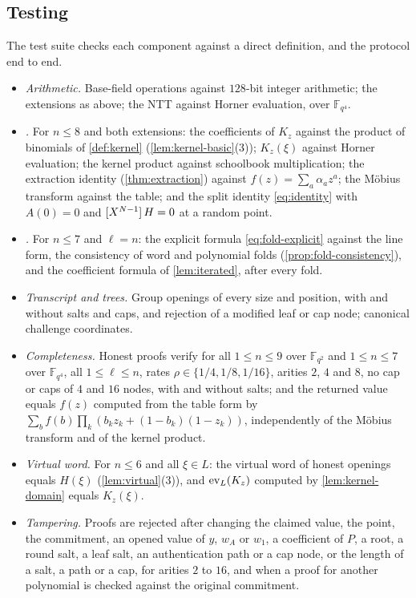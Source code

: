 \subsection{Testing}\label{sec:impl:tests}

The test suite checks each component against a direct definition, and the protocol end to end.
\begin{itemize}
  \item \emph{Arithmetic.} Base-field operations against $128$-bit integer arithmetic; the extensions as above; the NTT against Horner evaluation, over $\mathbb{F}_{q^4}$.
  \item \emph{.} For $n \le 8$ and both extensions: the coefficients of $K_z$ against the product of binomials of \cref{def:kernel} (\cref{lem:kernel-basic}(3)); $K_z(\xi)$ against Horner evaluation; the kernel product against schoolbook multiplication; the extraction identity (\cref{thm:extraction}) against $f(z) = \sum_a \alpha_a z^a$; the M\"obius transform against the table; and the split identity \eqref{eq:identity} with $A(0) = 0$ and $[X^{N-1}]\,H = 0$ at a random point.
  \item \emph{.} For $n \le 7$ and $\ell = n$: the explicit formula \eqref{eq:fold-explicit} against the line form, the consistency of word and polynomial folds (\cref{prop:fold-consistency}), and the coefficient formula of \cref{lem:iterated}, after every fold.
  \item \emph{Transcript and trees.} Group openings of every size and position, with and without salts and caps, and rejection of a modified leaf or cap node; canonical challenge coordinates.
  \item \emph{Completeness.} Honest proofs verify for all $1 \le n \le 9$ over $\mathbb{F}_{q^2}$ and $1 \le n \le 7$ over $\mathbb{F}_{q^4}$, all $1 \le \ell \le n$, rates $\rho \in \{1/4, 1/8, 1/16\}$, arities $2$, $4$ and $8$, no cap or caps of $4$ and $16$ nodes, with and without salts; and the returned value equals $f(z)$ computed from the table form by $\sum_b f(b) \prod_k (b_k z_k + (1-b_k)(1-z_k))$, independently of the M\"obius transform and of the kernel product.
  \item \emph{Virtual word.} For $n \le 6$ and all $\xi \in L$: the virtual word of honest openings equals $H(\xi)$ (\cref{lem:virtual}(3)), and $\mathrm{ev}_L(K_z)$ computed by \cref{lem:kernel-domain} equals $K_z(\xi)$.
  \item \emph{Tampering.} Proofs are rejected after changing the claimed value, the point, the commitment, an opened value of $y$, $w_A$ or $w_1$, a coefficient of $P$, a root, a round salt, a leaf salt, an authentication path or a cap node, or the length of a salt, a path or a cap, for arities $2$ to $16$, and when a proof for another polynomial is checked against the original commitment.

\end{itemize}
